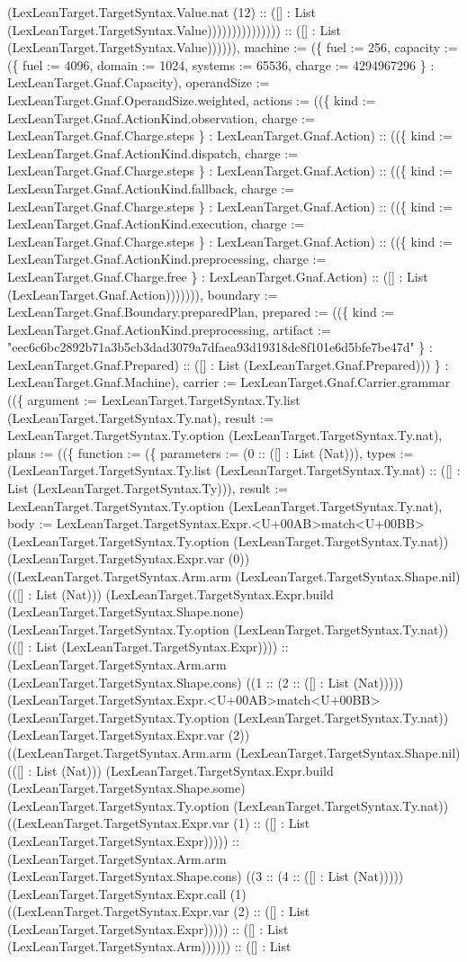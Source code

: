 \documentclass[11pt]{article}
\begin{document}
(LexLeanTarget.TargetSyntax.Value.nat (12) :: ([] : List (LexLeanTarget.TargetSyntax.Value))))))))))))))) :: ([] : List (LexLeanTarget.TargetSyntax.Value)))))), machine := (\{ fuel := 256, capacity := (\{ fuel := 4096, domain := 1024, systems := 65536, charge := 4294967296 \} : LexLeanTarget.Gnaf.Capacity), operandSize := LexLeanTarget.Gnaf.OperandSize.weighted, actions := ((\{ kind := LexLeanTarget.Gnaf.ActionKind.observation, charge := LexLeanTarget.Gnaf.Charge.steps \} : LexLeanTarget.Gnaf.Action) :: ((\{ kind := LexLeanTarget.Gnaf.ActionKind.dispatch, charge := LexLeanTarget.Gnaf.Charge.steps \} : LexLeanTarget.Gnaf.Action) :: ((\{ kind := LexLeanTarget.Gnaf.ActionKind.fallback, charge := LexLeanTarget.Gnaf.Charge.steps \} : LexLeanTarget.Gnaf.Action) :: ((\{ kind := LexLeanTarget.Gnaf.ActionKind.execution, charge := LexLeanTarget.Gnaf.Charge.steps \} : LexLeanTarget.Gnaf.Action) :: ((\{ kind := LexLeanTarget.Gnaf.ActionKind.preprocessing, charge := LexLeanTarget.Gnaf.Charge.free \} : LexLeanTarget.Gnaf.Action) :: ([] : List (LexLeanTarget.Gnaf.Action))))))), boundary := LexLeanTarget.Gnaf.Boundary.preparedPlan, prepared := ((\{ kind := LexLeanTarget.Gnaf.ActionKind.preprocessing, artifact := "eec6c6bc2892b71a3b5cb3dad3079a7dfaea93d19318dc8f101e6d5bfe7be47d" \} : LexLeanTarget.Gnaf.Prepared) :: ([] : List (LexLeanTarget.Gnaf.Prepared))) \} : LexLeanTarget.Gnaf.Machine), carrier := LexLeanTarget.Gnaf.Carrier.grammar ((\{ argument := LexLeanTarget.TargetSyntax.Ty.list (LexLeanTarget.TargetSyntax.Ty.nat), result := LexLeanTarget.TargetSyntax.Ty.option (LexLeanTarget.TargetSyntax.Ty.nat), plans := ((\{ function := (\{ parameters := (0 :: ([] : List (Nat))), types := (LexLeanTarget.TargetSyntax.Ty.list (LexLeanTarget.TargetSyntax.Ty.nat) :: ([] : List (LexLeanTarget.TargetSyntax.Ty))), result := LexLeanTarget.TargetSyntax.Ty.option (LexLeanTarget.TargetSyntax.Ty.nat), body := LexLeanTarget.TargetSyntax.Expr.<U+00AB>match<U+00BB> (LexLeanTarget.TargetSyntax.Ty.option (LexLeanTarget.TargetSyntax.Ty.nat)) (LexLeanTarget.TargetSyntax.Expr.var (0)) ((LexLeanTarget.TargetSyntax.Arm.arm (LexLeanTarget.TargetSyntax.Shape.nil) (([] : List (Nat))) (LexLeanTarget.TargetSyntax.Expr.build (LexLeanTarget.TargetSyntax.Shape.none) (LexLeanTarget.TargetSyntax.Ty.option (LexLeanTarget.TargetSyntax.Ty.nat)) (([] : List (LexLeanTarget.TargetSyntax.Expr)))) :: (LexLeanTarget.TargetSyntax.Arm.arm (LexLeanTarget.TargetSyntax.Shape.cons) ((1 :: (2 :: ([] : List (Nat))))) (LexLeanTarget.TargetSyntax.Expr.<U+00AB>match<U+00BB> (LexLeanTarget.TargetSyntax.Ty.option (LexLeanTarget.TargetSyntax.Ty.nat)) (LexLeanTarget.TargetSyntax.Expr.var (2)) ((LexLeanTarget.TargetSyntax.Arm.arm (LexLeanTarget.TargetSyntax.Shape.nil) (([] : List (Nat))) (LexLeanTarget.TargetSyntax.Expr.build (LexLeanTarget.TargetSyntax.Shape.some) (LexLeanTarget.TargetSyntax.Ty.option (LexLeanTarget.TargetSyntax.Ty.nat)) ((LexLeanTarget.TargetSyntax.Expr.var (1) :: ([] : List (LexLeanTarget.TargetSyntax.Expr))))) :: (LexLeanTarget.TargetSyntax.Arm.arm (LexLeanTarget.TargetSyntax.Shape.cons) ((3 :: (4 :: ([] : List (Nat))))) (LexLeanTarget.TargetSyntax.Expr.call (1) ((LexLeanTarget.TargetSyntax.Expr.var (2) :: ([] : List (LexLeanTarget.TargetSyntax.Expr))))) :: ([] : List (LexLeanTarget.TargetSyntax.Arm)))))) :: ([] : List 
\end{document}
